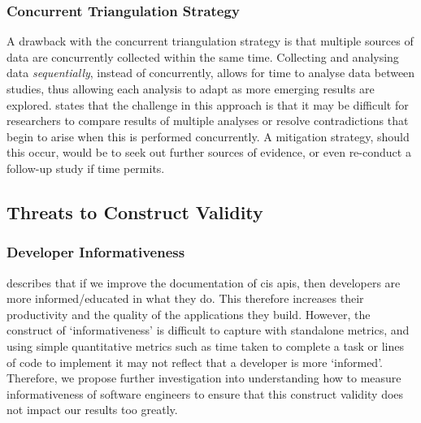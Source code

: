 \subsubsection{Concurrent Triangulation Strategy}

A drawback with the concurrent triangulation strategy is that multiple sources of data are concurrently collected within the same time. Collecting and analysing data \textit{sequentially}, instead of concurrently, allows for time to analyse data between studies, thus allowing each analysis to adapt as more emerging results are explored. \citet{Easterbrook:2007ws} states that the challenge in this approach is that it may be difficult for researchers to compare results of multiple analyses or resolve contradictions that begin to arise when this is performed concurrently. A mitigation strategy, should this occur, would be to seek out further sources of evidence, or even re-conduct a follow-up study if time permits.

\subsection{Threats to Construct Validity}

\subsubsection{Developer Informativeness}

 describes that if we improve the documentation of \gls{cis} \glspl{api}, then developers are more informed/educated in what they do. This therefore increases their productivity and the quality of the applications they build. However, the construct of `informativeness' is difficult to capture with standalone metrics, and using simple quantitative metrics such as time taken to complete a task or lines of code to implement it may not reflect that a developer is more `informed'. Therefore, we propose further investigation into understanding how to measure informativeness of software engineers to ensure that this construct validity does not impact our results too greatly.



